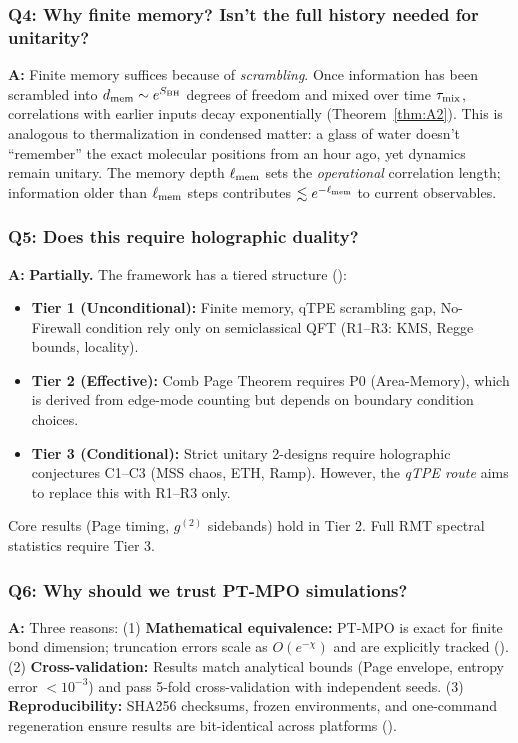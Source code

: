 \documentclass[aps,prd,preprint,onecolumn,superscriptaddress,nofootinbib,longbibliography,floatfix,11pt,showpacs,showkeys]{revtex4-2}
\theoremstyle{plain}
\theoremstyle{definition}
\theoremstyle{remark}
\begin{document}
\subsubsection{Q4: Why finite memory? Isn't the full history needed for unitarity?}
\textbf{A:} Finite memory suffices because of \emph{scrambling}. Once information has been scrambled into $d_{\rm mem} \sim e^{S_{\rm BH}}$ degrees of freedom and mixed over time $\tau_{\rm mix}$, correlations with earlier inputs decay exponentially (Theorem~\ref{thm:A2}). This is analogous to thermalization in condensed matter: a glass of water doesn't ``remember'' the exact molecular positions from an hour ago, yet dynamics remain unitary. The memory depth $\ell_{\rm mem}$ sets the \emph{operational} correlation length; information older than $\ell_{\rm mem}$ steps contributes $\lesssim e^{-\ell_{\rm mem}}$ to current observables.

\subsubsection{Q5: Does this require holographic duality?}
\textbf{A:} \textbf{Partially.} The framework has a tiered structure ():
\begin{itemize}[leftmargin=1.5em,itemsep=0.1em]
    \item \textbf{Tier 1 (Unconditional):} Finite memory, qTPE scrambling gap, No-Firewall condition rely only on semiclassical QFT (R1--R3: KMS, Regge bounds, locality).
    \item \textbf{Tier 2 (Effective):} Comb Page Theorem requires P0 (Area-Memory), which is derived from edge-mode counting but depends on boundary condition choices.
    \item \textbf{Tier 3 (Conditional):} Strict unitary 2-designs require holographic conjectures C1--C3 (MSS chaos, ETH, Ramp). However, the \emph{qTPE route} aims to replace this with R1--R3 only.
\end{itemize}
Core results (Page timing, $g^{(2)}$ sidebands) hold in Tier 2. Full RMT spectral statistics require Tier 3.

\subsubsection{Q6: Why should we trust PT-MPO simulations?}
\textbf{A:} Three reasons: (1) \textbf{Mathematical equivalence:} PT-MPO is exact for finite bond dimension; truncation errors scale as $O(e^{-\chi})$ and are explicitly tracked (). (2) \textbf{Cross-validation:} Results match analytical bounds (Page envelope, entropy error $<10^{-3}$) and pass 5-fold cross-validation with independent seeds. (3) \textbf{Reproducibility:} SHA256 checksums, frozen environments, and one-command regeneration ensure results are bit-identical across platforms ().
\end{document}
